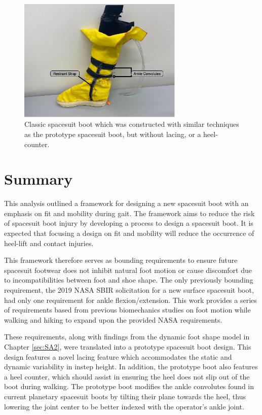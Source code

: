 \documentclass[defaultstyle,11pt]{thesis}
\begin{document}
\begin{figure}
\hypertarget{fig:SA3-classic_boot}{%
\centering
\includegraphics[width=0.7\textwidth,height=\textheight]{../fig/SA3/Classic_Spaceboot.png}
\caption{Classic spacesuit boot which was constructed with similar techniques as the prototype spacesuit boot, but without lacing, or a heel-counter.}\label{fig:SA3-classic_boot}
}
\end{figure}

\hypertarget{summary-5}{%
\section{Summary}\label{summary-5}}

This analysis outlined a framework for designing a new spacesuit boot with an emphasis on fit and mobility during gait.
The framework aims to reduce the risk of spacesuit boot injury by developing a process to design a spacesuit boot.
It is expected that focusing a design on fit and mobility will reduce the occurrence of heel-lift and contact injuries.

This framework therefore serves as bounding requirements to ensure future spacesuit footwear does not inhibit natural foot motion or cause discomfort due to incompatibilities between foot and shoe shape.
The only previously bounding requirement, the 2019 NASA SBIR solicitation for a new surface spacesuit boot, had only one requirement for ankle flexion/extension.
This work provides a series of requirements based from previous biomechanics studies on foot motion while walking and hiking to expand upon the provided NASA requirements.

These requirements, along with findings from the dynamic foot shape model in Chapter \ref{sec:SA2}, were translated into a prototype spacesuit boot design.
This design features a novel lacing feature which accommodates the static and dynamic variability in instep height.
In addition, the prototype boot also features a heel counter, which should assist in ensuring the heel does not slip out of the boot during walking.
The prototype boot modifies the ankle convolutes found in current planetary spacesuit boots by tilting their plane towards the heel, thus lowering the joint center to be better indexed with the operator's ankle joint.
\end{document}
